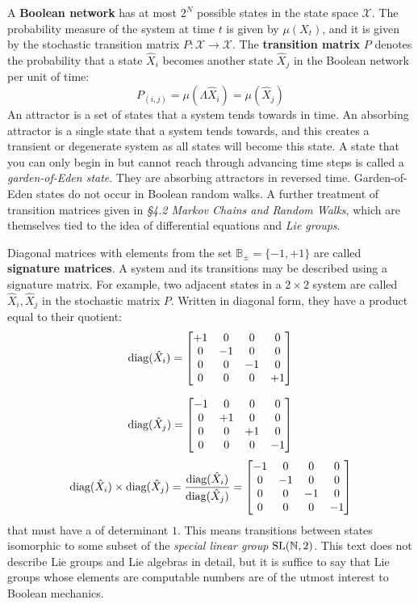 \documentclass[10pt, a5paper, twoside, openright]{memoir}
\begin{document}
A \textbf{Boolean network} has at most $2^N$ possible states in the state space $\mathcal X$. The probability measure of the system at time $t$ is given by $\mu(X_t)$, and it is given by the stochastic transition matrix $P: \mathcal X \rightarrow \mathcal X$. The \textbf{transition matrix} $P$ denotes the probability that a state $\hat X_i$ becomes another state $\hat X_j$ in the Boolean network per unit of time:
$$P_{(i,j)} = \mu(\Lambda \hat X_i) = \mu(\hat X_j)$$
An attractor is a set of states that a system tends towards in time. An absorbing attractor is a single state that a system tends towards, and this creates a transient or degenerate system as all states will become this state. A state that you can only begin in but cannot reach through advancing time steps is called a \textit{garden-of-Eden state}. They are absorbing attractors in reversed time. Garden-of-Eden states do not occur in Boolean random walks. A further treatment of transition matrices given in \textit{\S 4.2 Markov Chains and Random Walks}, which are themselves tied to the idea of differential equations and \textit{Lie groups}. 

Diagonal matrices with elements from the set $\mathbb B_\pm = \{-1, +1\}$ are called \textbf{signature matrices}. A system and its transitions may be described using a signature matrix. For example, two adjacent states in a $2 \times 2$ system are called $\hat X_i, \hat X_j$ in the stochastic matrix $P$. Written in diagonal form, they have a product equal to their quotient:
$$\textnormal{diag}(\hat X_i) =\begin{bmatrix}
+1 & 0 & 0 & 0 \\
0 & -1 & 0 & 0 \\
0 & 0 & -1 & 0 \\
0 & 0 & 0 & +1
\end{bmatrix}$$

$$\textnormal{diag}(\hat X_j)=\begin{bmatrix}
-1 & 0 & 0 & 0 \\
0 & +1 & 0 & 0 \\
0 & 0 & +1 & 0 \\
0 & 0 & 0 & -1
\end{bmatrix}
$$
$$
\textnormal{diag}(\hat X_i) \times \textnormal{diag}(\hat X_j) = \frac{\textnormal{diag}(\hat X_i)}{\textnormal{diag}(\hat X_j)} = 
\begin{bmatrix}
-1 & 0 & 0 & 0 \\
0 & -1 & 0 & 0 \\
0 & 0 & -1 & 0 \\
0 & 0 & 0 & -1
\end{bmatrix}
$$
that must have a of determinant $1$. This means transitions between states isomorphic to some subset of the \textit{special linear group} $\textnormal{SL}(\mathbb N, 2)$. This text does not describe Lie groups and Lie algebras in detail, but it is suffice to say that Lie groups whose elements are computable numbers are of the utmost interest to Boolean mechanics.
\end{document}
